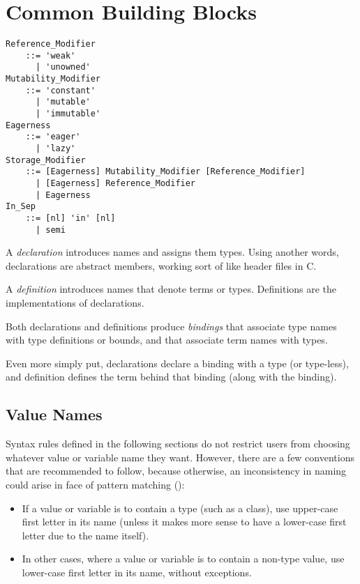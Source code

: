 
\chapter{Common Building Blocks}

\minitoc

\newpage

\grammar\begin{lstlisting}
Reference_Modifier
    ::= 'weak'
      | 'unowned'
Mutability_Modifier  
    ::= 'constant' 
      | 'mutable' 
      | 'immutable'
Eagerness 
    ::= 'eager' 
      | 'lazy'
Storage_Modifier
    ::= [Eagerness] Mutability_Modifier [Reference_Modifier]
      | [Eagerness] Reference_Modifier
      | Eagerness
In_Sep
    ::= [nl] 'in' [nl] 
      | semi
\end{lstlisting}

A {\em declaration} introduces names and assigns them types. Using another words, declarations are abstract members, working sort of like header files in C. 

A {\em definition} introduces names that denote terms or types. Definitions are the implementations of declarations. 

Both declarations and definitions produce {\em bindings} that associate type names with type definitions or bounds, and that associate term names with types. 

Even more simply put, declarations declare a binding with a type (or type-less), and definition defines the term behind that binding (along with the binding). 





\section{Value Names}
\label{sec:val-var-names}

Syntax rules defined in the following sections do not restrict users from choosing whatever value or variable name they want. However, there are a few conventions that are recommended to follow, because otherwise, an inconsistency in naming could arise in face of pattern matching ():

\begin{itemize}
  \item If a value or variable is to contain a type (such as a class), use upper-case first letter in its name (unless it makes more sense to have a lower-case first letter due to the name itself). 
  \item In other cases, where a value or variable is to contain a non-type value, use lower-case first letter in its name, without exceptions. 
\end{itemize}

